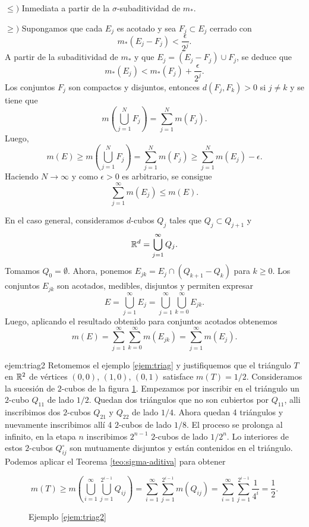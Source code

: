 \begin{demo}{}
$\leq)$
Inmediata a partir de la $\sigma$-subaditividad de $m_{*}$.

$\geq )$
Supongamos que cada $E_j$ es acotado y sea $F_j\subset E_j$ cerrado con 
\[
m_{*}(E_j-F_j)<\frac{\epsilon}{2^j}.
\]
A partir de la subaditividad de $m_{*}$ y que $E_j=(E_j-F_j)\cup F_j$, se deduce que
\[
m_{*}(E_j)<m_{*}(F_j)+\frac{\epsilon}{2^j}.\]
Los conjuntos $F_j$ son compactos y disjuntos, entonces
$d(F_j,F_k)>0$ si $j\neq k$ y se tiene que
\[
m\left(\bigcup\limits_{j=1}^{N} F_j\right)=
\sum\limits_{j=1}^N m(F_j).
\]
Luego, 
\[
m(E)\geq m\left( \bigcup\limits_{j=1}^N F_j\right)=
\sum\limits_{j=1}^N m(F_j)\geq \sum\limits_{j=1}^N m(E_j)-\epsilon.
\]
Haciendo $N\to \infty$ y como $\epsilon>0$ es arbitrario, se consigue
\[
\sum\limits_{j=1}^{\infty}m(E_j)\leq m(E).
\]

En el caso general, consideramos $d$-cubos $Q_j$ tales que $Q_j\subset Q_{j+1}$ y 
\[
\mathbb{R}^d=\bigcup\limits_{j=1}^{\infty} Q_j.
\]
Tomamos $Q_0=\emptyset$. Ahora, ponemos $E_{jk}=E_j\cap (Q_{k+1}-Q_{k})$ para $k\geq 0$.
Los conjuntos $E_{jk}$ son acotados, medibles, disjuntos y permiten expresar
\[
E=\bigcup\limits_{j=1}^{\infty} E_j=
\bigcup\limits_{j=1}^{\infty} \bigcup\limits_{k=0}^{\infty} E_{jk}.
\]
Luego, aplicando el resultado obtenido para  conjuntos acotados obtenemos
\[
m(E)=\sum\limits_{j=1}^{\infty}\sum\limits_{k=0}^{\infty}m(E_{jk})=
\sum\limits_{j=1}^{\infty} m(E_j).
\]
\end{demo}


  \begin{ejemplo}{ejem:triag2} Retomemos el ejemplo \ref{ejem:triag} y justifiquemos que el triángulo $T$ en $\mathbb{R}^2$ de vértices $(0,0)$, $(1,0)$, $(0,1)$ satisface $m(T)=1/2$. Consideramos la sucesión de $2$-cubos de la figura \ref{fig:descomp2}. Empezamos por inscribir en el triángulo un $2$-cubo $Q_{11}$ de lado $1/2$. Quedan dos triángulos que no son cubiertos por $Q_{11}$, alli inscribimos dos $2$-cubos $Q_{21}$ y $Q_{22}$ de lado $1/4$. Ahora quedan 4 triángulos y nuevamente inscribimos allí 4 $2$-cubos de lado $1/8$. El proceso se prolonga al infinito, en la etapa $n$ inscribimos $2^{n-1}$ $2$-cubos de lado $1/2^n$. Lo interiores de estos $2$-cubos $Q_{ij}^\circ$ son mutuamente disjuntos y están contenidos en el triángulo. Podemos aplicar  el Teorema \ref{teo:sigma-aditiva} para obtener
  
  \[
   m(T)\geq m\left( \bigcup_{i=1}^\infty\bigcup_{j=1}^{2^{i-1}}Q_{ij}\right)=\sum_{i=1}^\infty\sum_{j=1}^{2^{i-1}} m\left( Q_{ij}  \right)=
   \sum_{i=1}^\infty\sum_{j=1}^{2^{i-1}} \frac{1}{4^i}=\frac12.  \]

    
    
    

 \begin{figure}[H]
 \begin{center}
  \def\svgwidth{8cm}

 \end{center}
 \caption{Ejemplo \ref{ejem:triag2}}\label{fig:descomp2}
\end{figure}  
  \end{ejemplo}




